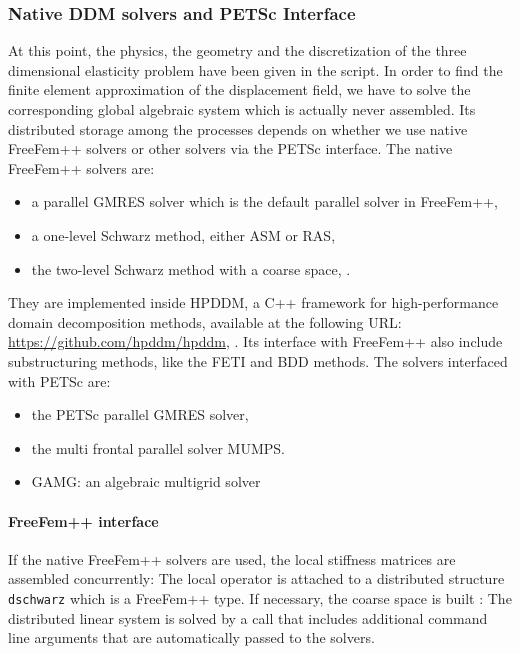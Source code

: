 
\subsubsection{Native DDM solvers and PETSc Interface} %
\label{sub:ddm_solvers_and_petsc_interface}
At this point, the physics, the geometry and the discretization of the three dimensional elasticity problem have been given in the script. In order to find the finite element approximation of the displacement field, we have to solve the corresponding global algebraic system which is actually never assembled. Its distributed storage among the processes depends on whether we use native FreeFem++ solvers or other solvers via the PETSc interface. The native FreeFem++ solvers are:
	\begin{itemize}
		\item a parallel GMRES solver which is the default parallel solver in FreeFem++,
		\item a one-level Schwarz method, either ASM or RAS,
		\item the two-level Schwarz method with a \geneo coarse space, \cite{Dolean:2015:IDD}.
	\end{itemize}
 They are implemented inside HPDDM, a C++ framework for high-performance domain decomposition methods, available at the following URL: \url{https://github.com/hpddm/hpddm}, \cite{Jolivet:2014:HPD}. Its interface with FreeFem++ also include substructuring methods, like the FETI and BDD methods.
 The solvers interfaced with PETSc are:
	\begin{itemize}
		\item the PETSc parallel GMRES solver,
		\item the multi frontal parallel solver MUMPS. %
        \item GAMG: an algebraic multigrid solver
	\end{itemize}

\paragraph{FreeFem++ interface} %
\label{par:_tt_freefem_interface}


If the native FreeFem++ solvers are used, the local stiffness matrices are assembled concurrently:
The local operator is attached to a distributed structure \texttt{dschwarz} which is a FreeFem++ type. If necessary, the \geneo coarse space is built : 
The distributed linear system is solved by a call that includes additional command line arguments that are automatically passed to the solvers.

